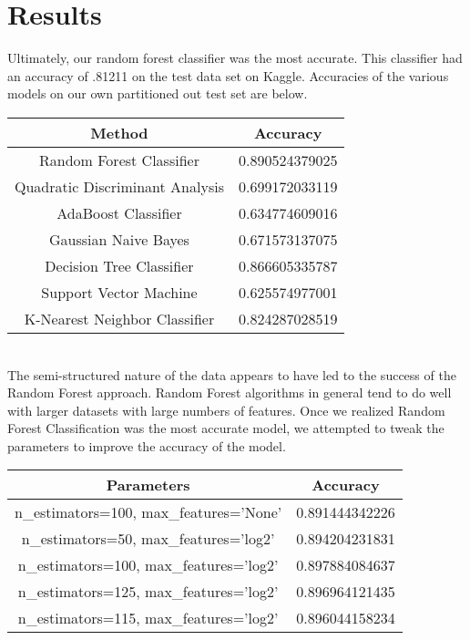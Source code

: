 \documentclass{article}
\begin{document}
\section{Results}
Ultimately, our random forest classifier was the most accurate.  This classifier had an accuracy of .81211 on the test data set on Kaggle. Accuracies of the various models on our own partitioned out test set are below. 
\begin{table}[ht]
\centering 
\begin{tabular}{c c } 
\hline 
Method & Accuracy\\ [0.5ex] 
\hline 
Random Forest Classifier & 0.890524379025 \\ 
Quadratic Discriminant Analysis & 0.699172033119\\
AdaBoost Classifier & 0.634774609016\\
Gaussian Naive Bayes & 0.671573137075\\
Decision Tree Classifier & 0.866605335787\\
Support Vector Machine & 0.625574977001\\
K-Nearest Neighbor Classifier & 0.824287028519\\ [1ex] 
\hline 
\end{tabular}
\label{table:nonlin} 
\end{table}\\
The semi-structured nature of the data appears to have led to the success of the Random Forest approach. Random Forest algorithms in general tend to do well with larger datasets with large numbers of features. Once we realized Random Forest Classification was the most accurate model, we attempted to tweak the parameters to improve the accuracy of the model. 
\begin{table}[ht]
\centering 
\begin{tabular}{c c } 
\hline 
Parameters & Accuracy\\ [0.5ex] 
\hline 
n\_estimators=100, max\_features='None' & 0.891444342226\\ 
n\_estimators=50, max\_features='log2' & 0.894204231831\\
n\_estimators=100, max\_features='log2' & 0.897884084637\\
n\_estimators=125, max\_features='log2' & 0.896964121435\\
n\_estimators=115, max\_features='log2' & 0.896044158234\\ [1ex] 
\hline 
\end{tabular}
\label{table:nonlin} 
\end{table}
\end{document}
